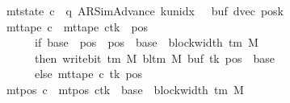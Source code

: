 \begin{isabellebody}
\ \ \ \ \ \ \ \ \ \ \ \ \ \ {\isasymand}\ mt{\isacharunderscore}{\kern0pt}state\ c{\isacharprime}{\kern0pt}{\isacharprime}{\kern0pt}\ {\isacharequal}{\kern0pt}\ {\isacharparenleft}{\kern0pt}q{\isacharcomma}{\kern0pt}\ AR{\isacharunderscore}{\kern0pt}SimAdvance{\isacharcomma}{\kern0pt}\ k{\isacharunderscore}{\kern0pt}unidx\ {}{\isacharcomma}{\kern0pt}\ {}{\isacharcomma}{\kern0pt}\ buf{\isacharcomma}{\kern0pt}\ dvec{\isacharcomma}{\kern0pt}\ posk{\isacharparenright}{\kern0pt}\isanewline
\ \ \ \ \ \ \ \ \ \ \ \ \ \ {\isasymand}\ mt{\isacharunderscore}{\kern0pt}tape\ c{\isacharprime}{\kern0pt}{\isacharprime}{\kern0pt}\ {\isacharequal}{\kern0pt}\ {\isacharparenleft}{\kern0pt}mt{\isacharunderscore}{\kern0pt}tape\ c{\isacharprime}{\kern0pt}{\isacharparenright}{\kern0pt}{\isacharparenleft}{\kern0pt}tk\ {\isacharcolon}{\kern0pt}{\isacharequal}{\kern0pt}\ {\isacharparenleft}{\kern0pt}{\isasymlambda}pos{\isachardot}{\kern0pt}\isanewline
\ \ \ \ \ \ \ \ \ \ \ \ \ \ \ \ \ \ \ \ if\ base\ {\isasymle}\ pos\ {\isasymand}\ pos\ {\isacharless}{\kern0pt}\ base\ {\isacharplus}{\kern0pt}\ block{\isacharunderscore}{\kern0pt}width\ {\isacharparenleft}{\kern0pt}{\isasymGamma}{\isacharunderscore}{\kern0pt}tm\ M{\isacharparenright}{\kern0pt}\isanewline
\ \ \ \ \ \ \ \ \ \ \ \ \ \ \ \ \ \ \ \ then\ write{\isacharunderscore}{\kern0pt}bit\ {\isacharparenleft}{\kern0pt}{\isasymGamma}{\isacharunderscore}{\kern0pt}tm\ M{\isacharparenright}{\kern0pt}\ {\isacharparenleft}{\kern0pt}bl{\isacharunderscore}{\kern0pt}tm\ M{\isacharparenright}{\kern0pt}\ {\isacharparenleft}{\kern0pt}buf\ tk{\isacharparenright}{\kern0pt}\ {\isacharparenleft}{\kern0pt}pos\ {\isacharminus}{\kern0pt}\ base{\isacharparenright}{\kern0pt}\isanewline
\ \ \ \ \ \ \ \ \ \ \ \ \ \ \ \ \ \ \ \ else\ mt{\isacharunderscore}{\kern0pt}tape\ c{\isacharprime}{\kern0pt}\ tk\ pos{\isacharparenright}{\kern0pt}{\isacharparenright}{\kern0pt}\isanewline
\ \ \ \ \ \ \ \ \ \ \ \ \ \ {\isasymand}\ mt{\isacharunderscore}{\kern0pt}pos\ c{\isacharprime}{\kern0pt}{\isacharprime}{\kern0pt}\ {\isacharequal}{\kern0pt}\ {\isacharparenleft}{\kern0pt}mt{\isacharunderscore}{\kern0pt}pos\ c{\isacharprime}{\kern0pt}{\isacharparenright}{\kern0pt}{\isacharparenleft}{\kern0pt}tk\ {\isacharcolon}{\kern0pt}{\isacharequal}{\kern0pt}\ base\ {\isacharplus}{\kern0pt}\ block{\isacharunderscore}{\kern0pt}width\ {\isacharparenleft}{\kern0pt}{\isasymGamma}{\isacharunderscore}{\kern0pt}tm\ M{\isacharparenright}{\kern0pt}{\isacharparenright}{\kern0pt}{\isachardoublequoteclose}\isanewline
%
\isadelimproof
\ \ %
\endisadelimproof
%
\isatagproof

\end{isabellebody}

